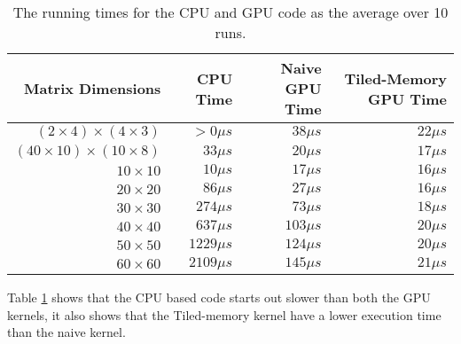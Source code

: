 \begin{table}
    \begin{tabular}{|r|r|r|r|}
        \hline
        \textbf{Matrix Dimensions} & \textbf{CPU Time} & \textbf{Naive GPU Time} & \textbf{Tiled-Memory GPU Time}\\\hline
        $(2\times 4)\times(4\times 3)$ & $>0\mu s$ & $38\mu s$ & $22\mu s$ \\
        $(40\times 10)\times(10\times 8)$ & $33\mu s$ & $20\mu s$ & $17\mu s$ \\

        $10 \times 10$ & $10\mu s$   & $17\mu s$  & $16\mu s$ \\
        $20 \times 20$ & $86\mu s$   & $27\mu s$  & $16\mu s$ \\
        $30 \times 30$ & $274\mu s$  & $73\mu s$  & $18\mu s$ \\
        $40 \times 40$ & $637\mu s$  & $103\mu s$ & $20\mu s$ \\
        $50 \times 50$ & $1229\mu s$ & $124\mu s$ & $20\mu s$ \\
        $60 \times 60$ & $2109\mu s$ & $145\mu s$ & $21\mu s$ \\ \hline

    \end{tabular}
    \caption{The running times for the CPU and GPU code as the average over 10
    runs.}
    \label{tab:task3time}
\end{table}

Table \ref{tab:task3time} shows that the CPU based code starts out slower than
both the GPU kernels, it also shows that the Tiled-memory kernel have a lower
execution time than the naive kernel.
